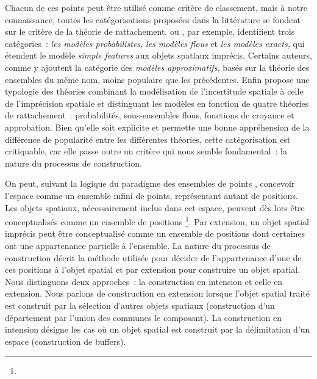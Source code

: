 Chacun de ces points peut être utilisé comme critère de classement,
mais à notre connaissance, toutes les catégorisations proposées dans
la littérature se fondent sur le critère de la théorie de
rattachement. \textcite{Clementini2008} ou \textcite{Erwig1997}, par
exemple, identifient trois catégories : \emph{les modèles
  probabilistes,} \emph{les modèles flous} et \emph{les modèles
  exacts,} qui étendent le modèle \emph{simple features} aux objets
spatiaux imprécis. Certains auteurs, comme
\textcite{Schneider2001,Schneider2008,Carniel2016} y ajoutent la
catégorie des \emph{modèles approximatifs,} basés sur la théorie des
ensembles du même nom, moins populaire que les précédentes. Enfin
\textcite{Fisher2003,Fisher2005,Fisher2006} propose une typologie des
théories combinant la modélisation de l’incertitude spatiale à celle
de l’imprécision spatiale et distinguant les modèles en fonction de
quatre théories de rattachement : probabilités, sous-ensembles flous,
fonctions de croyance et approbation. Bien qu’elle soit explicite et
permette une bonne appréhension de la différence de popularité entre
les différentes théories, cette catégorisation est critiquable, car
elle passe outre un critère qui nous semble fondamental : la nature du
processus de construction.

On peut, suivant la logique du paradigme des ensembles de points
\autocite{Egenhofer1990}, concevoir l’espace comme un ensemble infini
de points, représentant autant de positions. Les objets spatiaux,
nécessairement inclus dans cet espace, peuvent dès lors être
conceptualisés comme un ensemble de positions \footnote{}. Par
extension, un objet spatial imprécis peut être conceptualisé comme un
ensemble de positions dont certaines ont une appartenance partielle à
l’ensemble. La nature du processus de construction décrit la méthode
utilisée pour décider de l’appartenance d’une de ces positions à
l’objet spatial et par extension pour construire un objet
spatial. Nous distinguons deux approches : la construction en
intension et celle en extension. Nous parlons de construction en
extension lorsque l’objet spatial traité est construit par la
sélection d’autres objets spatiaux (\eg construction d’un département
par l’union des communes le composant). La construction en intension
désigne les cas où un objet spatial est construit par la délimitation
d’un espace (\eg construction de buffers).

